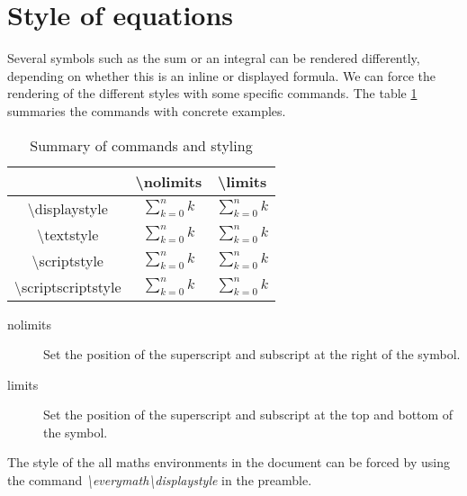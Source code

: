 \documentclass{article}
\begin{document}
\section*{Style of equations}

Several symbols such as the sum or an integral can be rendered differently, depending on whether this is an inline or displayed formula. We can force the rendering of the different styles with some specific commands. The table \ref{table:custom-rendering} summaries the commands with concrete examples.

\begin{table}[h]
	\centering
	\begin{tabular}{| c | c | c |}
		\hline
											& \textbackslash nolimits							& \textbackslash limits \\
		\hline
		\textbackslash displaystyle			& $\displaystyle\sum\nolimits_{k=0}^{n}k$			& $\displaystyle\sum\limits_{k=0}^{n}k$ \\
		\hline
		\textbackslash textstyle			& $\textstyle\sum\nolimits_{k=0}^{n}k$				& $\textstyle\sum\limits_{k=0}^{n}k$ \\
		\hline
		\textbackslash scriptstyle			& $\scriptstyle\sum\nolimits_{k=0}^{n}k$			& $\scriptstyle\sum\limits_{k=0}^{n}k$ \\
		\hline
		\textbackslash scriptscriptstyle	& $\scriptscriptstyle\sum\nolimits_{k=0}^{n}k$		& $\scriptscriptstyle\sum\limits_{k=0}^{n}k$ \\
		\hline
	\end{tabular}
	\caption{Summary of commands and styling}
	\label{table:custom-rendering}
\end{table}


\begin{description}
	\item[nolimits] Set the position of the superscript and subscript at the right of the symbol.
	\item[limits] Set the position of the superscript and subscript at the top and bottom of the symbol.
\end{description}

The style of the all maths environments in the document can be forced by using the command \emph{\textbackslash everymath{\textbackslash displaystyle}} in the preamble.
\end{document}
